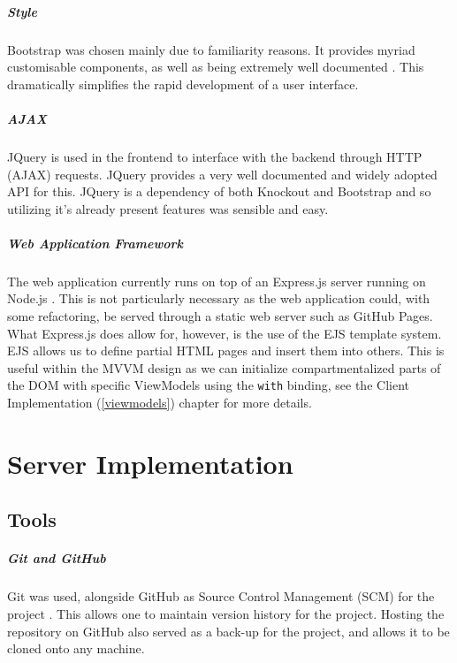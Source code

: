 \documentclass{l4proj}
\newcommand{\code}[1]{\texttt{#1}}
\begin{document}
\paragraph{Style}
Bootstrap was chosen mainly due to familiarity reasons. It provides myriad customisable components, as well as being extremely well documented \cite{bootstrap}. This dramatically simplifies the rapid development of a user interface.

\paragraph{AJAX}
JQuery is used in the frontend to interface with the backend through HTTP (AJAX) requests. JQuery provides a very well documented and widely adopted API for this. JQuery is a dependency of both Knockout and Bootstrap and so utilizing it's already present features was sensible and easy.

\paragraph{Web Application Framework}
The web application currently runs on top of an Express.js server running on Node.js \cite{express} \cite{node}. This is not particularly necessary as the web application could, with some refactoring, be served through a static web server such as GitHub Pages. What Express.js does allow for, however, is the use of the EJS template system. EJS allows us to define partial HTML pages and insert them into others. This is useful within the MVVM design as we can initialize compartmentalized parts of the DOM with specific ViewModels using the \code{with} binding, see the Client Implementation (\ref{viewmodels}) chapter for more details.

\chapter{Server Implementation}
\section{Tools}
\paragraph{Git and GitHub}
Git was used, alongside GitHub as Source Control Management (SCM) for the project \cite{git} \cite{github}. This allows one to maintain version history for the project. Hosting the repository on GitHub also served as a back-up for the project, and allows it to be cloned onto any machine.
\end{document}
